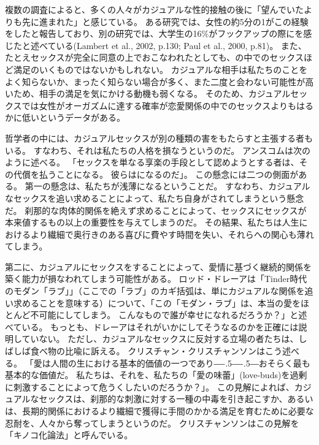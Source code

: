 \documentclass[paper=a4,book,openany]{jlreq}
\def\DDASH{―\kern-.5\zw―\kern-.5\zw―} %
\begin{document}
複数の調査によると、多くの人々がカジュアルな性的接触の後に「望んでいたよりも先に進まれた」と感じている。
ある研究では、女性の約5分の1がこの経験をしたと報告しており、別の研究では、大学生の16\%がフックアップの際にを感じたと述べている(Lambert et al., 2002, p.130; Paul et al., 2000, p.81)。
\nocite{lambert02:_plur_ignor_hook_up}\nocite{paul00:_hook}
また、たとえセックスが完全に同意の上でおこなわれたとしても、の中でのセックスほど満足のいくものではないかもしれない。
カジュアルな相手は私たちのことをよく知らないか、まったく知らない場合が多く、また二度と会わない可能性が高いため、相手の満足を気にかける動機も弱くなる。
そのため、カジュアルセックスでは女性がオーガズムに達する確率が恋愛関係の中でのセックスよりもはるかに低いというデータがある\citep{armstrong10:_orgas_coll_hook_relat}。

哲学者の中には、カジュアルセックスが別の種類の害をもたらすと主張する者もいる。
すなわち、それは私たちの人格を損なうというのだ。
アンスコムは次のように述べる。
「セックスを単なる享楽の手段として認めようとする者は、その代償を払うことになる。
彼らはになるのだ」\citep{anscombe72contraception}。
この懸念には二つの側面がある。
第一の懸念は、私たちが浅薄になるということだ。
すなわち、カジュアルなセックスを追い求めることによって、私たち自身がされてしまうという懸念だ。
刹那的な肉体的関係を絶えず求めることによって、セックスにセックスが本来値するもの以上の重要性を与えてしまうのだ。
その結果、私たちは人生におけるより繊細で奥行きのある喜びに費やす時間を失い、それらへの関心も薄れてしまう。

第二に、カジュアルにセックスをすることによって、愛情に基づく継続的関係を築く能力が損なわれてしまう可能性がある。
ロッド・ドレーアは「Tinder時代のモダン「ラブ」」（ここでの「ラブ」のカギ括弧は、単にカジュアルな関係を追い求めることを意味する）について、「この「モダン・ラブ」は、本当の愛をほとんど不可能にしてしまう。
こんなもので誰が幸せになれるだろうか？」と述べている\citep{dreher15:_moder_love_age_tind}。
もっとも、ドレーアはそれがいかにしてそうなるのかを正確には説明していない。
ただし、カジュアルなセックスに反対する立場の者たちは、しばしば食べ物の比喩に訴える。
クリスチャン・クリスチャンソンはこう述べる。
「愛は人間の生における基本的価値の一つであり{\DDASH}おそらく最も基本的な価値だ。
私たちは、それを、私たちの「愛の味蕾」(love-buds)を過剰に刺激することによって危うくしたいのだろうか？」\citep[p.105]{krisjansson98:_casual_sex_revis}。
この見解によれば、カジュアルなセックスは、刹那的な刺激に対する一種の中毒を引き起こすか、あるいは、長期的関係におけるより繊細で獲得に手間のかかる満足を育むために必要な忍耐を、人々から奪ってしまうというのだ。
クリスチャンソンはこの見解を「キノコ化論法」と呼んでいる。
\end{document}
